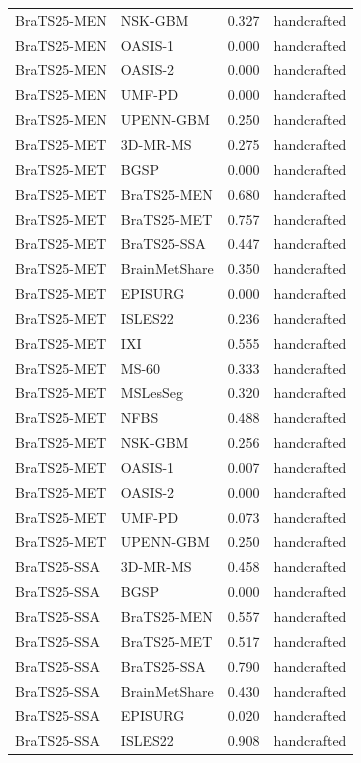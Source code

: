 \begin{tabular}{llrl}
BraTS25-MEN & NSK-GBM & 0.327 & handcrafted \\
BraTS25-MEN & OASIS-1 & 0.000 & handcrafted \\
BraTS25-MEN & OASIS-2 & 0.000 & handcrafted \\
BraTS25-MEN & UMF-PD & 0.000 & handcrafted \\
BraTS25-MEN & UPENN-GBM & 0.250 & handcrafted \\
BraTS25-MET & 3D-MR-MS & 0.275 & handcrafted \\
BraTS25-MET & BGSP & 0.000 & handcrafted \\
BraTS25-MET & BraTS25-MEN & 0.680 & handcrafted \\
BraTS25-MET & BraTS25-MET & 0.757 & handcrafted \\
BraTS25-MET & BraTS25-SSA & 0.447 & handcrafted \\
BraTS25-MET & BrainMetShare & 0.350 & handcrafted \\
BraTS25-MET & EPISURG & 0.000 & handcrafted \\
BraTS25-MET & ISLES22 & 0.236 & handcrafted \\
BraTS25-MET & IXI & 0.555 & handcrafted \\
BraTS25-MET & MS-60 & 0.333 & handcrafted \\
BraTS25-MET & MSLesSeg & 0.320 & handcrafted \\
BraTS25-MET & NFBS & 0.488 & handcrafted \\
BraTS25-MET & NSK-GBM & 0.256 & handcrafted \\
BraTS25-MET & OASIS-1 & 0.007 & handcrafted \\
BraTS25-MET & OASIS-2 & 0.000 & handcrafted \\
BraTS25-MET & UMF-PD & 0.073 & handcrafted \\
BraTS25-MET & UPENN-GBM & 0.250 & handcrafted \\
BraTS25-SSA & 3D-MR-MS & 0.458 & handcrafted \\
BraTS25-SSA & BGSP & 0.000 & handcrafted \\
BraTS25-SSA & BraTS25-MEN & 0.557 & handcrafted \\
BraTS25-SSA & BraTS25-MET & 0.517 & handcrafted \\
BraTS25-SSA & BraTS25-SSA & 0.790 & handcrafted \\
BraTS25-SSA & BrainMetShare & 0.430 & handcrafted \\
BraTS25-SSA & EPISURG & 0.020 & handcrafted \\
BraTS25-SSA & ISLES22 & 0.908 & handcrafted \\

\end{tabular}
